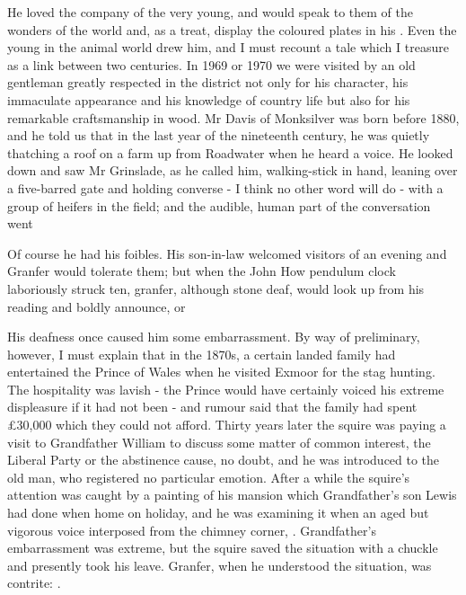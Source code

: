 He loved the company of the very young, and would speak to them of the wonders of the world and, as a treat, display the coloured plates in his . Even the young in the animal world drew him, and I must recount a tale which I treasure as a link between two centuries. In 1969 or 1970 we were visited by an old gentleman greatly respected in the district not only for his character, his immaculate appearance and his knowledge of country life but also for his remarkable craftsmanship in wood. Mr Davis of Monksilver was born before 1880, and he told us that in the last year of the nineteenth century, he was quietly thatching a roof on a farm up from Roadwater when he heard a voice. He looked down and saw Mr Grinslade, as he called him, walking-stick in hand, leaning over a five-barred gate and holding converse - I think no other word will do - with a group of heifers in the field; and the audible, human part of the conversation went 

Of course he had his foibles. His son-in-law welcomed visitors of an evening and Granfer would tolerate them; but when the John How pendulum clock laboriously struck ten, granfer, although stone deaf, would look up from his reading and boldly announce,  or 

His deafness once caused him some embarrassment. By way of preliminary, however, I must explain that in the 1870s, a certain landed family had entertained the Prince of Wales when he visited Exmoor for the stag hunting. The hospitality was lavish - the Prince would have certainly voiced his extreme displeasure if it had not been - and rumour said that the family had spent £30,000 which they could not afford. Thirty years later the squire was paying a visit to Grandfather William to discuss some matter of common interest, the Liberal Party or the abstinence cause, no doubt, and he was introduced to the old man, who registered no particular emotion. After a while the squire's attention was caught by a painting of his mansion which Grandfather's son Lewis had done when home on holiday, and he was examining it when an aged but vigorous voice interposed from the chimney corner, . Grandfather's embarrassment was extreme, but the squire saved the situation with a chuckle and presently took his leave. Granfer, when he understood the situation, was contrite: .
 
